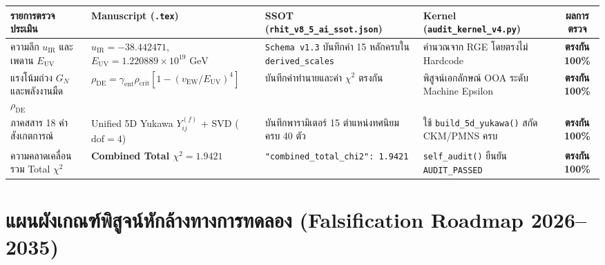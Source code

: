 \documentclass[11pt, a4paper]{article}
\begin{document}
\begin{center}
\begin{tabular}{p{3.0cm}p{3.8cm}p{4.0cm}p{4.0cm}c}
\toprule
\textbf{รายการตรวจประเมิน} & \textbf{Manuscript (\texttt{.tex})} & \textbf{SSOT (\texttt{rhit\_v8\_5\_ai\_ssot.json})} & \textbf{Kernel (\texttt{audit\_kernel\_v4.py})} & \textbf{ผลการตรวจ} \\
\midrule
ความลึก $u_{\text{IR}}$ และเพดาน $E_{\text{UV}}$ & $u_{\text{IR}} = -38.442471$, $E_{\text{UV}} = 1.220889 \times 10^{19}\text{ GeV}$ & \texttt{Schema v1.3} บันทึกค่า 15 หลักครบใน \texttt{derived\_scales} & คำนวณจาก RGE โดยตรงไม่ Hardcode & \textbf{ตรงกัน 100\%} \\
\rowcolor{rowtint}
แรงโน้มถ่วง $G_N$ และพลังงานมืด $\rho_{\text{DE}}$ & $\rho_{\text{DE}} = \gamma_{\text{ent}} \rho_{\text{crit}} [1 - (v_{\text{EW}}/E_{\text{UV}})^4]$ & บันทึกค่าทำนายและค่า $\chi^2$ ตรงกัน & พิสูจน์เอกลักษณ์ OOA ระดับ Machine Epsilon & \textbf{ตรงกัน 100\%} \\
ภาคสสาร 18 ค่าสังเกตการณ์ & Unified 5D Yukawa $Y_{ij}^{(f)}$ + SVD ($\text{dof} = 4$) & บันทึกพารามิเตอร์ 15 ตำแหน่งทศนิยมครบ 40 ตัว & ใช้ \texttt{build\_5d\_yukawa()} สกัด CKM/PMNS ครบ & \textbf{ตรงกัน 100\%} \\
\rowcolor{rowtint}
ความคลาดเคลื่อนรวม Total $\chi^2$ & \textbf{Combined Total $\chi^2 = 1.9421$} & \texttt{"combined\_total\_chi2": 1.9421} & \texttt{self\_audit()} ยืนยัน \texttt{AUDIT\_PASSED} & \textbf{ตรงกัน 100\%} \\
\bottomrule
\end{tabular}
\end{center}

\section{แผนผังเกณฑ์พิสูจน์หักล้างทางการทดลอง (Falsification Roadmap 2026--2035)}
\end{document}
